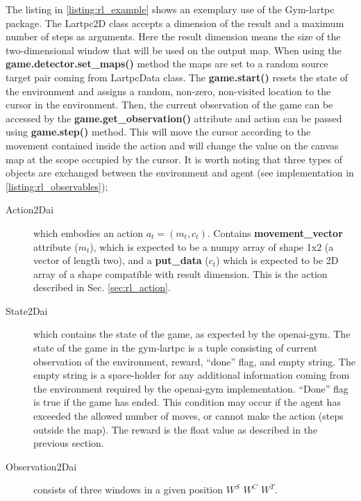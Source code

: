 \begin{sloppypar}
The listing in \ref{listing:rl_example} shows an exemplary use of the Gym-lartpc package.
The Lartpc2D class accepts a dimension of the result and a maximum number of steps as arguments.
Here the result dimension means the size of the two-dimensional window that will be used on the output map.
When using the \textbf{game.detector.set\_maps()} method the maps are set to a random source target pair coming from LartpcData class.
The \textbf{game.start()} resets the state of the environment and assigns a random, non-zero, non-visited location to the cursor in the environment.
Then, the current observation of the game can be accessed by the \textbf{game.get\_observation()} attribute and action can be passed using \textbf{game.step()} method. This will move the cursor according to the movement contained inside the action and will change the value on the canvas map at the scope occupied by the cursor.
It is worth noting that three types of objects are exchanged between the environment and agent (see implementation in \ref{listing:rl_observables});
\end{sloppypar}

\begin{description}
\item[Action2Dai] which embodies an action $a_{t} = (m_{t}, c_{t})$. Contains \textbf{movement\_vector} attribute ($m_t$), which is expected to be a numpy array of shape 1x2 (a vector of length two), and a \textbf{put\_data} ($c_t$) which is expected to be 2D array of a shape compatible with result dimension. This is the action described in Sec. \ref{sec:rl_action}.

\item[State2Dai] which contains the state of the game, as expected by the openai-gym. The state of the game in the gym-lartpc is a tuple consisting of current observation of the environment, reward, ``done'' flag, and empty string.
The empty string is a space-holder for any additional information coming from the environment required by the openai-gym implementation. ``Done'' flag is true if the game has ended.
This condition may occur if the agent has exceeded the allowed number of moves, or cannot make the action (steps outside the map).
The reward is the float value as described in the previous section.

\item[Observation2Dai] consists of three windows in a given position $W^{S}$ $W^{C}$ $W^{T}$.
\end{description}

